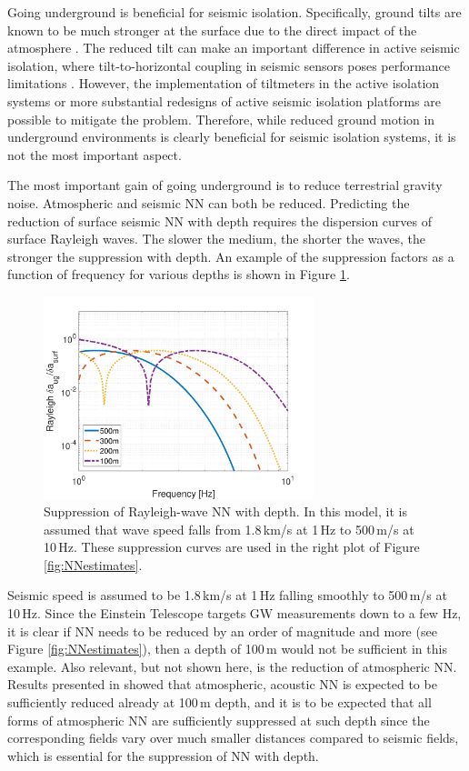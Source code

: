 Going underground is beneficial for seismic isolation. Specifically, ground tilts are known to be much stronger at the surface due to the direct impact of the atmosphere \cite{DABo2012}. The reduced tilt can make an important difference in active seismic isolation, where tilt-to-horizontal coupling in seismic sensors poses performance limitations \cite{MaEv2015,MLMa2018}. However, the implementation of tiltmeters in the active isolation systems \cite{VeEA2014} or more substantial redesigns of active seismic isolation platforms \cite{MLMa2018} are possible to mitigate the problem. Therefore, while reduced ground motion in underground environments is clearly beneficial for seismic isolation systems, it is not the most important aspect. 

The most important gain of going underground is to reduce terrestrial gravity noise. Atmospheric and seismic NN can both be reduced. Predicting the reduction of surface seismic NN with depth requires the dispersion curves of surface Rayleigh waves. The slower the medium, the shorter the waves, the stronger the suppression with depth. An example of the suppression factors as a function of frequency for various depths is shown in Figure \ref{fig:RayleighNNdepth}. 
\begin{figure}[t]
	\begin{center} 
		\includegraphics[width=0.7\textwidth]{./SiteInfra/SiteRequirements/SiteRequirementsFigures/RayleighNNdepth.pdf} 
		\caption{Suppression of Rayleigh-wave NN with depth. In this model, it is assumed that wave speed falls from 1.8\,km/s at 1\,Hz to 500\,m/s at 10\,Hz. These suppression curves are used in the right plot of Figure \ref{fig:NNestimates}.}
		\label{fig:RayleighNNdepth} 
	\end{center}
\end{figure}
Seismic speed is assumed to be 1.8\,km/s at 1\,Hz falling smoothly to 500\,m/s at 10\,Hz. Since the Einstein Telescope targets GW measurements down to a few Hz, it is clear if NN needs to be reduced by an order of magnitude and more (see Figure \ref{fig:NNestimates}), then a depth of 100\,m would not be sufficient in this example. Also relevant, but not shown here, is the reduction of atmospheric NN. Results presented in \cite{FiEA2018} showed that atmospheric, acoustic NN is expected to be sufficiently reduced already at 100\,m depth, and it is to be expected that all forms of atmospheric NN are sufficiently suppressed at such depth since the corresponding fields vary over much smaller distances compared to seismic fields, which is essential for the suppression of NN with depth. 

